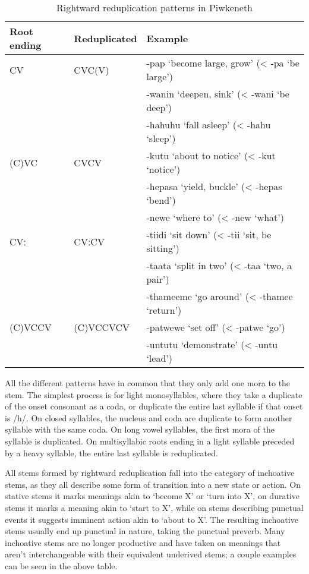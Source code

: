\documentclass[smallroyalvopaper,9pt]{memoir}
\newcommand{\lang}{Piwkeneth}
\newcommand{\longv}{ː}
\begin{document}
\begin{table}[ht]
    \centering
    \begin{tabular}{lll}
        \toprule
        Root ending & Reduplicated & Example \\
        \midrule
        CV    & CVC(V)  & -pap `become large, grow' (< -pa `be large') \\
              &         & -wanin `deepen, sink' (< -wani `be deep') \\
              &         & -hahuhu `fall asleep' (< -hahu `sleep') \\
        (C)VC & CVCV    & -kutu `about to notice' (< -kut `notice') \\
              &         & -hepasa `yield, buckle' (< -hepas `bend') \\
              &         & -newe `where to' (< -new `what') \\
        CV\longv{} & CV\longv{}CV & -tiidi `sit down' (< -tii `sit, be sitting') \\
              &         & -taata `split in two' (< -taa `two, a pair') \\
              &         & -thameeme `go around' (< -thamee `return') \\
        (C)VCCV & (C)VCCVCV & -patwewe `set off' (< -patwe `go') \\
              &         & -untutu `demonstrate' (< -untu `lead') \\
        \bottomrule
    \end{tabular}
    \caption{Rightward reduplication patterns in \lang}
\end{table}

All the different patterns have in common that they only add one mora to the stem. The simplest process is for light monosyllables, where they take a duplicate of the onset consonant as a coda, or duplicate the entire last syllable if that onset is /h/. On closed syllables, the nucleus and coda are duplicate to form another syllable with the same coda. On long vowel syllables, the first mora of the syllable is duplicated. On multisyllabic roots ending in a light syllable preceded by a heavy syllable, the entire last syllable is reduplicated.

All stems formed by rightward reduplication fall into the category of inchoative stems, as they all describe some form of transition into a new state or action. On stative stems it marks meanings akin to `become X' or `turn into X', on durative stems it marks a meaning akin to `start to X', while on stems describing punctual events it suggests imminent action akin to `about to X'. The resulting inchoative stems usually end up punctual in nature, taking the punctual preverb. Many inchoative stems are no longer productive and have taken on meanings that aren't interchangeable with their equivalent underived stems; a couple examples can be seen in the above table.
\end{document}
